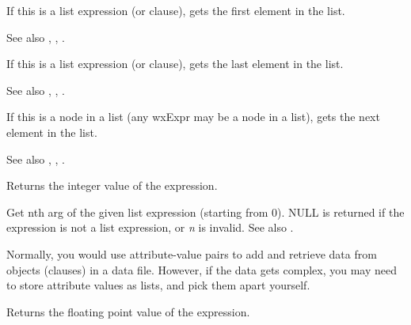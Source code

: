 \label{wxexprgetfirst}


If this is a list expression (or clause), gets the first element in the list.

See also , , .

\label{wxexprgetlast}


If this is a list expression (or clause), gets the last element in the list.

See also , , .

\label{wxexprgetnext}


If this is a node in a list (any wxExpr may be a node in a list), gets the
next element in the list.

See also , , .

\label{wxexprintegervalue}


Returns the integer value of the expression.

\label{wxexprnth}


Get nth arg of the given list expression (starting from 0). NULL is returned if
the expression is not a list expression, or {\it n} is invalid. See also .

Normally, you would use attribute-value pairs to add and retrieve data
from objects (clauses) in a data file. However, if the data gets complex,
you may need to store attribute values as lists, and pick them apart
yourself.

\label{wxexprrealvalue}


Returns the floating point value of the expression.

